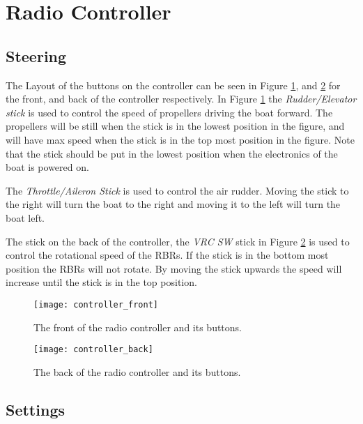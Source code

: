 \section{Radio Controller}
\subsection{Steering}
The Layout of the buttons on the controller can be seen in Figure \ref{fig:controller_front}, and \ref{fig:controller_back} for the front, and back of the controller respectively. In Figure \ref{fig:controller_front} the \textit{Rudder/Elevator stick} is used to control the speed of propellers driving the boat forward. The propellers will be still when the stick is in the lowest position in the figure, and will have max speed when the stick is in the top most position in the figure. Note that the stick should be put in the lowest position when the electronics of the boat is powered on.

The \textit{Throttle/Aileron Stick} is used to control the air rudder. Moving the stick to the right will turn the boat to the right and moving it to the left will turn the boat left.

The stick on the back of the controller, the \textit{VRC SW} stick in Figure \ref{fig:controller_back} is used to control the rotational speed of the RBRs. If the stick is in the bottom most position the RBRs will not rotate. By moving the stick upwards the speed will increase until the stick is in the top position.


\begin{figure}[p]
   \centering
   \texttt{[image: controller\_front]}
   \caption{The front of the radio controller and its buttons.}
   \label{fig:controller_front}
\end{figure}

\begin{figure}[p]
   \centering
   \texttt{[image: controller\_back]}
   \caption{The back of the radio controller and its buttons.}
   \label{fig:controller_back}
\end{figure}

\subsection{Settings}


